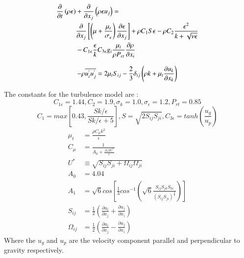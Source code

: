 \documentclass[preprint,12pt]{elsarticle}
\begin{document}
\begin{equation}
\centering
\begin{split}
 \frac{\partial }{\partial t} \left(\rho \epsilon \right) &+ \frac{\partial }{\partial x_j} \left( \rho \epsilon u_j \right) = \\
 &\frac{\partial }{\partial x_j } \left[ \left( \mu + \frac{\mu_t }{\sigma_\epsilon } \right) \frac{\partial \epsilon }{\partial x_j } \right] + \rho C_1 S \epsilon - \rho C_2 \frac{\epsilon^2 }{k+\sqrt{\nu \epsilon}} \\
 &- C_{1 \epsilon} \frac{\epsilon}{k} C_{3\epsilon} g_i \frac{\mu_t}{\rho P_{rt}} \frac{\partial \rho}{\partial x_i}
\label{eq:e}
\end{split}
\end{equation}

\begin{equation}
\centering
- \rho \overline{u^{'}_{i} u^{'}_{j}} = 2\mu_t S_{ij} - \frac{2}{3} \delta_{ij} \left( \rho k + \mu_t \frac{\partial u_k}{\partial x_k} \right)
\label{eq:reynoldsstress}
\end{equation}

The constants for the turbulence model are \cite{realizable,fluent} : 
\begin{equation}
\label{eq:constants}
C_{1\epsilon} = 1.44 , C_2 = 1.9 , \sigma_k = 1.0 , \sigma_\epsilon = 1.2 , P_{rt} = 0.85 
\end{equation}
\begin{equation}
C_1 = max\left[0.43,\frac{Sk/\epsilon}{Sk/\epsilon +5} \right] , S = \sqrt{2S_{ij}S_{ji}} , C_{3\epsilon} = tanh\left(\frac{u_g}{u_p}\right)
\end{equation}
\begin{subequations}
\begin{align}
\mu_t &= \frac{\rho C_{\mu} k^2}{\epsilon} \\
C_{\mu} &= \frac{1}{A_0 + \frac{A_1 k U^*}{\epsilon}} \\
U^* &\equiv \sqrt{S_{ij} S_{ji} + \Omega_{ij} \Omega_{ji}} \\
A_0 &= 4.04 \\
A_1 &= \sqrt{6} cos \left[\frac{1}{3} cos^{-1}\left(\sqrt{6} \frac{S_{ij}S_{jk}S_{ki}}{\left(S_{ij} S_{ji} \right)^{\frac{3}{2}}} \right) \right] \\
S_{ij} &= \frac{1}{2} \left( \frac{\partial u_i}{\partial x_j} + \frac{\partial u_j}{\partial x_i} \right) \\
\Omega_{ij} &= \frac{1}{2} \left( \frac{\partial u_i}{\partial x_j} - \frac{\partial u_j}{\partial x_i} \right)
\end{align}
\end{subequations}
Where the $u_g$ and $u_p$ are the velocity component parallel and perpendicular to gravity respectively.
\end{document}

